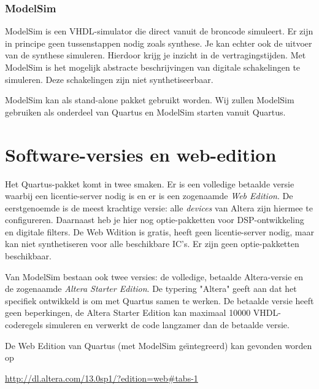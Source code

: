 \documentclass[a4paper,12pt,fleqn,twoside]{book}
\begin{document}
\subsubsection{ModelSim}
ModelSim is een VHDL-simulator die direct vanuit de broncode simuleert. Er zijn
in principe geen tussenstappen nodig zoals synthese. Je kan echter ook de
uitvoer van de synthese simuleren. Hierdoor krijg je inzicht in de
vertragingstijden. Met ModelSim is het mogelijk abstracte beschrijvingen van
digitale schakelingen te simuleren. Deze schakelingen zijn niet
synthetiseerbaar.

ModelSim kan als stand-alone pakket gebruikt worden. Wij zullen ModelSim
gebruiken als onderdeel van Quartus en ModelSim starten vanuit Quartus.


\section{Software-versies en web-edition}
\label{sec:softwareversies}
Het Quartus-pakket komt in twee smaken. Er is een volledige betaalde versie
waarbij een licentie-server nodig is en er is een zogenaamde \textsl{Web
Edition}. De
eerstgenoemde is de meest krachtige versie: alle \textsl{devices} van Altera
zijn hiermee te configureren. Daarnaast heb je hier nog optie-pakketten voor
DSP-ontwikkeling en digitale filters. De Web Wdition is gratis, heeft geen 
licentie-server nodig, maar kan niet synthetiseren voor alle beschikbare IC's.
Er zijn geen optie-pakketten beschikbaar.

Van ModelSim bestaan ook twee versies: de volledige, betaalde Altera-versie en
de zogenaamde \textsl{Altera Starter Edition}. De typering "Altera" geeft aan
dat het specifiek ontwikkeld is om met Quartus samen te werken. De betaalde
versie heeft geen beperkingen, de Altera Starter Edition kan maximaal 10000
VHDL-coderegels simuleren en verwerkt de code langzamer dan de betaalde versie.

De Web Edition van Quartus (met ModelSim ge\"{\i}ntegreerd) kan gevonden
worden op

\hspace*{1cm}\url{http://dl.altera.com/13.0sp1/?edition=web#tabs-1}

%
\end{document}
